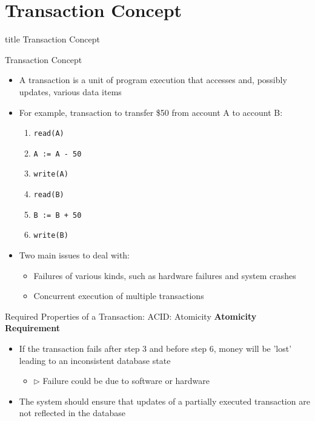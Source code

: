 \documentclass[aspectratio=169, xcolor=dvipsnames]{beamer}
\begin{document}
\section{Transaction Concept}
\begin{frame}
  \vfill
  \centering
  \begin{beamercolorbox}[sep=8pt,center,shadow=true,rounded=true]{title}
    Transaction Concept\par%
  \end{beamercolorbox}
  \vfill
\end{frame}

\begin{frame}{Transaction Concept}
    \begin{itemize}[<+->]
        \item A transaction is a unit of program execution that accesses and, possibly updates, various data items
        \item For example, transaction to transfer \$50 from account A to account B:
        \begin{enumerate}
            \item \texttt{read(A)}
            \item \texttt{A := A - 50}
            \item \texttt{write(A)}
            \item \texttt{read(B)}
            \item \texttt{B := B + 50}
            \item \texttt{write(B)}
        \end{enumerate}
        \item Two main issues to deal with:
        \begin{itemize}[<+->]
            \item Failures of various kinds, such as hardware failures and system crashes
            \item Concurrent execution of multiple transactions
        \end{itemize}
    \end{itemize}
\end{frame}

\begin{frame}{Required Properties of a Transaction: ACID: Atomicity}
    \textbf{Atomicity Requirement}
    \begin{itemize}[<+->]
        \item If the transaction fails after step 3 and before step 6, money will be 'lost' leading to an inconsistent database state
        \begin{itemize}[<+->]
            \item $\triangleright$ Failure could be due to software or hardware
        \end{itemize}
        \item The system should ensure that updates of a partially executed transaction are not reflected in the database
    \end{itemize}
\end{frame}
\end{document}
